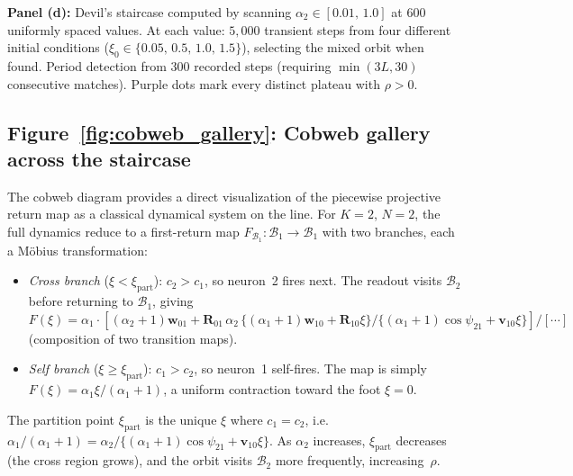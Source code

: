 \documentclass[12pt]{article}
\newcommand{\vv}[1]{\mathbf{#1}}
\newcommand{\Bsp}{\mathcal{B}}
\begin{document}
\textbf{Panel (d):} Devil's staircase computed by scanning $\alpha_2\in[0.01,\,1.0]$ at $600$ uniformly spaced values. At each value: $5{,}000$ transient steps from four different initial conditions ($\xi_0\in\{0.05,\,0.5,\,1.0,\,1.5\}$), selecting the mixed orbit when found.  Period detection from $300$ recorded steps (requiring $\min(3L,30)$ consecutive matches).  Purple dots mark every distinct plateau with $\rho>0$.

\subsection{Figure~\ref{fig:cobweb_gallery}: Cobweb gallery across the staircase}\label{app:cobweb-gallery}

The cobweb diagram provides a direct visualization of the 
piecewise projective return map as a classical dynamical system on 
the line.  For $K{=}2$, $N{=}2$, the full dynamics reduce to a 
first-return map $F_{\!\Bsp_1}:\Bsp_1\to\Bsp_1$ with two branches, each a
M\"obius transformation:
\begin{itemize}[nosep]
\item \emph{Cross branch} ($\xi<\xi_{\mathrm{part}}$): $c_2>c_1$, 
so neuron~2 fires next.  The readout visits $\Bsp_2$ before returning 
to $\Bsp_1$, giving $F(\xi)=\alpha_1 \cdot
[(\alpha_2+1)\vv{w}_{01}+\vv{R}_{01}\,\alpha_2\,\{(\alpha_1+1)\vv{w}_{10}+\vv{R}_{10}\xi\}/
\{(\alpha_1+1)\cos\psi_{21}+\vv{v}_{10}\xi\}] / [\cdots]$ (composition of two
transition maps).
\item \emph{Self branch} ($\xi\geq\xi_{\mathrm{part}}$): $c_1>c_2$, 
so neuron~1 self-fires.  The map is simply 
$F(\xi)=\alpha_1\xi/(\alpha_1+1)$, a uniform contraction toward the 
foot $\xi=0$.
\end{itemize}
The partition point $\xi_{\mathrm{part}}$ is the unique $\xi$ where 
$c_1=c_2$, i.e.\ $\alpha_1/(\alpha_1+1)=\alpha_2/\{(\alpha_1+1)\cos\psi_{21}+\vv{v}_{10}\xi\}$.  
As $\alpha_2$ increases, $\xi_{\mathrm{part}}$ decreases (the cross 
region grows), and the orbit visits $\Bsp_2$ more frequently, 
increasing~$\rho$.
\end{document}
